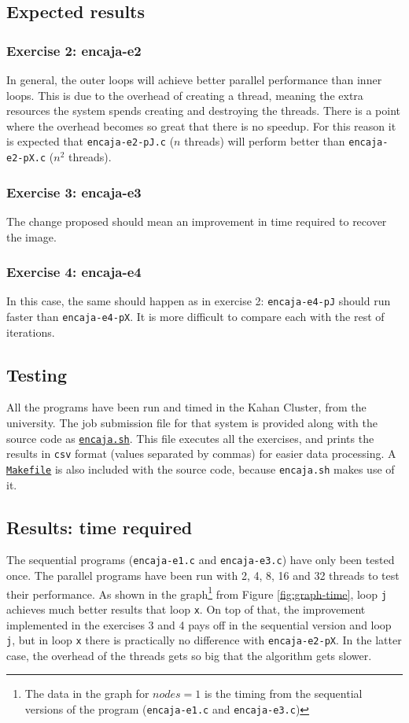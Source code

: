 \documentclass[a4paper]{article}
\newcommand{\github}{https://github.com/kauron/etsinf3/tree/master/CPA/lab2}
\begin{document}
\subsection{Expected results}
\subsubsection*{Exercise 2: encaja-e2}
In general, the outer loops will achieve better parallel performance than inner loops. This is due to the overhead of creating a thread, meaning the extra resources the system spends creating and  destroying the threads.
There is a point where the overhead becomes so great that there is no speedup. For this reason it is expected that \texttt{encaja-e2-pJ.c} ($n$ threads) will perform better than \texttt{encaja-e2-pX.c} ($n^2$ threads).
\subsubsection*{Exercise 3: encaja-e3}
The change proposed should mean an improvement in time required to recover the image.
\subsubsection*{Exercise 4: encaja-e4}
In this case, the same should happen as in exercise 2: \texttt{encaja-e4-pJ} should run faster than \texttt{encaja-e4-pX}. It is more difficult to compare each with the rest of iterations.

\subsection{Testing}
All the programs have been run and timed in the Kahan Cluster, from the university. The job submission file for that system is provided along with the source code as \texttt{\href{\github /encaja.sh}{encaja.sh}}. This file executes all the exercises, and prints the results in \texttt{csv} format (values separated by commas) for easier data processing. A \texttt{\href{\github /Makefile}{Makefile}} is also included with the source code, because \texttt{encaja.sh} makes use of it.

\subsection{Results: time required}
The sequential programs (\texttt{encaja-e1.c} and \texttt{encaja-e3.c}) have only been tested once.
The parallel programs have been run with 2, 4, 8, 16 and 32 threads to test their performance.
As shown in the graph\footnote{The data in the graph for $nodes=1$ is the timing from the sequential versions of the program (\texttt{encaja-e1.c} and \texttt{encaja-e3.c})} from Figure \ref{fig:graph-time}, loop \texttt{j} achieves much better results that loop \texttt{x}.
On top of that, the improvement implemented in the exercises 3 and 4 pays off in the sequential version and loop \texttt{j}, but in loop \texttt{x} there is practically no difference with \texttt{encaja-e2-pX}.
In the latter case, the overhead of the threads gets so big that the algorithm gets slower.
\end{document}
